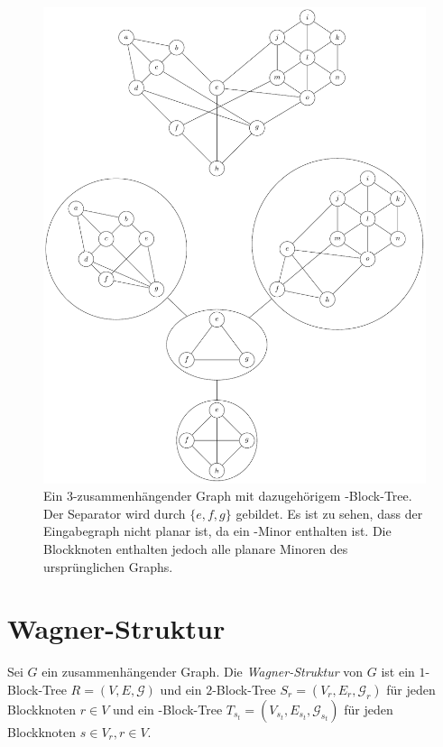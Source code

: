 \begin{figure}[H]
  \centering
  \includegraphics[width=\textwidth,height=\textheight,keepaspectratio]{bilder/33-Block-Tree.pdf}
  \caption{Ein $3$-zusammenhängender Graph mit dazugehörigem \dd-Block-Tree.
           Der Separator wird durch $\{e, f, g\}$ gebildet.
           Es ist zu sehen, dass der Eingabegraph nicht planar ist, da ein \kdd-Minor enthalten ist.
           Die Blockknoten enthalten jedoch alle planare Minoren des ursprünglichen Graphs.}
  \label{fig:33-Block-Tree}
\end{figure}


\section{Wagner-Struktur}
\begin{definition}\label{eq:WagnerStruktur}
  Sei $G$ ein zusammenhängender Graph.
  Die \emph{Wagner-Struktur} von $G$ ist ein $1$-Block-Tree $R = (V, E, \mathcal{G})$ und ein $2$-Block-Tree $S_r = (V_r, E_r, \mathcal{G}_r)$ für jeden Blockknoten $r \in V$ und ein \dd-Block-Tree $T_{s_t} = (V_{s_t}, E_{s_t}, \mathcal{G}_{s_t})$ für jeden Blockknoten $s \in V_r, r \in V$.
\end{definition}

